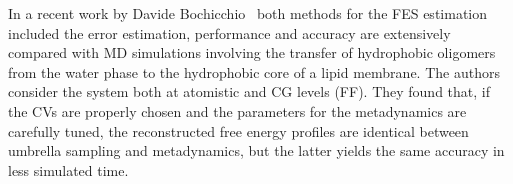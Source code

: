 In a recent work by Davide Bochicchio \etal\, \cite{metaUSComparison} both methods for the \ac{FES} estimation
included the error estimation, performance and accuracy are extensively compared with \ac{MD} simulations
involving the transfer of hydrophobic oligomers from the water phase to the hydrophobic core of a lipid membrane.
The authors consider the system both at atomistic and \ac{CG} levels (\martini \ac{FF}). They found that, if the
\acp{CV} are properly chosen and the parameters for the metadynamics are carefully tuned, the reconstructed free
energy profiles are identical between umbrella sampling and metadynamics, but the latter yields the same accuracy
in less simulated time.
